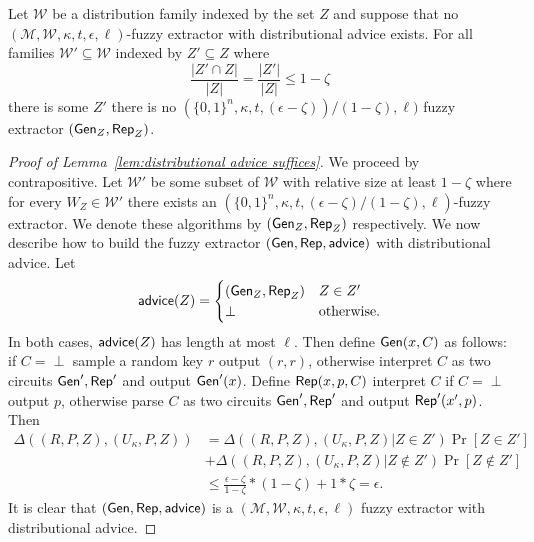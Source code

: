 \begin{lemma}

Let $\mathcal{W}$ be a distribution family indexed by the set $Z$ and suppose that no $(\mathcal{M}, \mathcal{W}, \kappa, t, \epsilon, \ell)$-fuzzy extractor with distributional advice exists.  For all families $\mathcal{W}'\subseteq \mathcal{W}$ indexed by $Z'\subseteq Z$ where \[\frac{|Z'\cap Z|}{|Z|} = \frac{|Z'|}{|Z|}\le 1-\zeta\] there is some $Z'$ there is no  $(\{0,1\}^n,\kappa, t, (\epsilon-\zeta))/(1-\zeta), \ell)$ fuzzy extractor $({\mathsf{Gen}}_Z, {\mathsf{Rep}}_Z)$.
\label{lem:distributional advice suffices}
\end{lemma}
\begin{proof}[Proof of Lemma~\ref{lem:distributional advice suffices}]
We proceed by contrapositive.  Let $\mathcal{W}'$ be some subset of $\mathcal{W}$ with relative size at least $1-\zeta$ where  for every $W_Z\in\mathcal{W}'$ there exists an $(\{0,1\}^n,\kappa, t, (\epsilon-\zeta)/(1-\zeta), \ell)$-fuzzy extractor.  We denote these algorithms by $({\mathsf{Gen}}_Z, {\mathsf{Rep}}_Z)$ respectively.  We now describe how to build the fuzzy extractor $({\mathsf{Gen}}, {\mathsf{Rep}}, {\mathsf{advice}})$ with distributional advice.  Let 
\[
{\mathsf{advice}}(Z) = \begin{cases} ({\mathsf{Gen}}_Z, {\mathsf{Rep}}_Z)& Z\in Z'\\\perp&\text{otherwise.}\end{cases}
\]
In both cases, ${\mathsf{advice}}(Z)$ has length at most $\ell$. Then define ${\mathsf{Gen}}(x, C)$ as follows:  if $C = \perp$ sample a random key $r$ output $(r, r)$, otherwise interpret $C$ as two circuits ${\mathsf{Gen}}', {\mathsf{Rep}}'$ and output ${\mathsf{Gen}}'(x)$.  Define ${\mathsf{Rep}}(x, p, C)$ interpret $C$ if $C = \perp$ output $p$, otherwise parse $C$ as two circuits ${\mathsf{Gen}}', {\mathsf{Rep}}'$ and output ${\mathsf{Rep}}'(x', p)$.  
Then 
\begin{align*}
\Delta((R, P, Z), (U_\kappa, P, Z)) &= \Delta((R, P, Z), (U_\kappa, P, Z) | Z\in Z')\Pr[Z\in Z']\\&+\Delta((R, P, Z), (U_\kappa, P, Z) | Z\not\in Z')\Pr[Z\not \in Z']\\
&\le \frac{\epsilon-\zeta}{1-\zeta} * (1-\zeta) + 1* \zeta = \epsilon.
\end{align*}
It is clear that $({\mathsf{Gen}}, {\mathsf{Rep}}, {\mathsf{advice}})$ is a $(\mathcal{M}, \mathcal{W}, \kappa, t, \epsilon, \ell)$ fuzzy extractor with distributional advice.
\end{proof}

